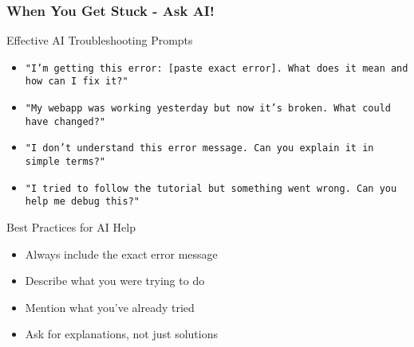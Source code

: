 \documentclass[aspectratio=169]{beamer}
\begin{document}
\begin{frame}
\frametitle{When You Get Stuck - Ask AI!}
\begin{alertblock}{Effective AI Troubleshooting Prompts}
\begin{itemize}
\footnotesize
\item \texttt{"I'm getting this error: [paste exact error]. What does it mean and how can I fix it?"}
\item \texttt{"My webapp was working yesterday but now it's broken. What could have changed?"}
\item \texttt{"I don't understand this error message. Can you explain it in simple terms?"}
\item \texttt{"I tried to follow the tutorial but something went wrong. Can you help me debug this?"}
\end{itemize}
\end{alertblock}

\begin{exampleblock}{Best Practices for AI Help}
\begin{itemize}
\footnotesize
\item Always include the exact error message
\item Describe what you were trying to do
\item Mention what you've already tried
\item Ask for explanations, not just solutions
\end{itemize}
\end{exampleblock}
\end{frame}
\end{document}
